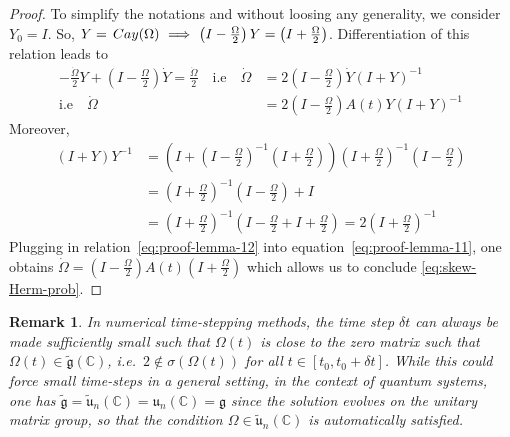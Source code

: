 \documentclass{article}
\newtheorem{remark}{Remark}
\newcommand{\Cay}{\,{\rm Cay}}
\def\boris{\textcolor{red}}
\newcommand{\C}{\mathbb{C}}
\newcommand{\Om}{\Omega}
\begin{document}
{\begin{proof}
To simplify the notations and without loosing any generality, we consider $Y_0 = I$. 
So,
$Y = \Cay(\Om) ~ \Longrightarrow ~ \left(I - \frac{\Om}{2}\right) Y = \left(I + \frac{\Om}{2}\right)$. Differentiation of this relation leads to
%
\begin{equation}
\label{eq:proof-lemma-11}
\begin{aligned}
- \frac{\dot\Om}{2} Y + \left(I - \frac{\Om}{2}\right) \dot Y  = \frac{\dot\Om}{2} \quad
\text{i.e} \quad \dot \Om &= 2 \left(I - \frac{\Om}{2} \right) \dot Y  \left(I + Y\right)^{-1} \\
\text{i.e} \quad \dot \Omega &= 2 \left(I - \frac{\Om}{2}\right) A(t)Y \left(I + Y \right)^{-1} 
\end{aligned}
\end{equation}
%
Moreover,
%
\begin{equation}
\label{eq:proof-lemma-12}
\begin{aligned}
\left(I + Y \right) Y^{-1} &= \left(I +  \left(I - \frac{\Om}{2} \right)^{-1}  \left(I + \frac{\Om}{2} \right) \right)\left(I + \frac{\Om}{2} \right)^{-1}  \left(I - \frac{\Om}{2} \right)\\
&= \left(I + \frac{\Om}{2} \right)^{-1} \left(I - \frac{\Om}{2} \right) + I \\
&= \left(I + \frac{\Om}{2} \right)^{-1}\left(I - \frac{\Om}{2} + I + \frac{\Om}{2} \right) = 2 \left(I + \frac{\Om}{2} \right)^{-1}
\end{aligned}
\end{equation}
%
Plugging in relation~\eqref{eq:proof-lemma-12} into equation~\eqref{eq:proof-lemma-11}, one obtains
%
$
\dot\Omega = \left(I - \frac{\Om}{2}\right) A(t) \left(I + \frac{\Om}{2} \right) 
$
which allows us to conclude \eqref{eq:skew-Herm-prob}.
\end{proof}

\begin{remark}
In numerical time-stepping methods, the time step $\delta t$ can always be made sufficiently small such that $\Omega(t)$ is close to the zero matrix such that $\Omega(t) \in \tilde{\mathfrak{g}}(\mathbb C)$, i.e.\ $2 \not \in \sigma(\Omega(t))$ for all $t \in [t_0,t_0 + \delta t]$. While this could force small time-steps in a general setting,
in the context of quantum systems, one has $\tilde{\mathfrak g} = \tilde{\mathfrak u}_n(\C) = \mathfrak u_n(\C) = \mathfrak g$ since the solution evolves on the unitary matrix group, so that the condition $\Om \in \tilde{\mathfrak u}_n(\C)$ is automatically satisfied.


\end{remark}}
\end{document}
